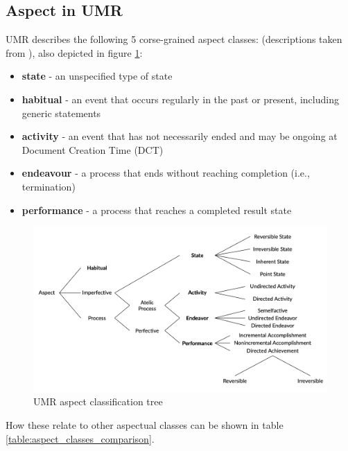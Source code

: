 \subsection*{Aspect in UMR}
\label{aspect_in_umr}
UMR describes the following 5 corse-grained aspect classes: (descriptions taken from \citet{umr}), also depicted in figure \ref{fig:umr_aspect_tree}:
\begin{itemize}
    \item \textbf{state} - an unspecified type of state
    \item \textbf{habitual} - an event that occurs regularly in the past or
    present, including generic statements
    \item \textbf{activity} - an event that has not necessarily ended and may
    be ongoing at Document Creation Time (DCT)
    \item \textbf{endeavour} - a process that ends without reaching completion
    (i.e., termination)
    \item \textbf{performance} - a process that reaches a completed result
    state
\end{itemize}

\begin{figure}
    \includegraphics[width=\textwidth]{img/umr_aspct_tree.png}
    \caption{UMR aspect classification tree \citep{umrslides2022}}
    \label{fig:umr_aspect_tree}
\end{figure}

How these relate to other aspectual classes can be shown in table \ref{table:aspect_classes_comparison}.

